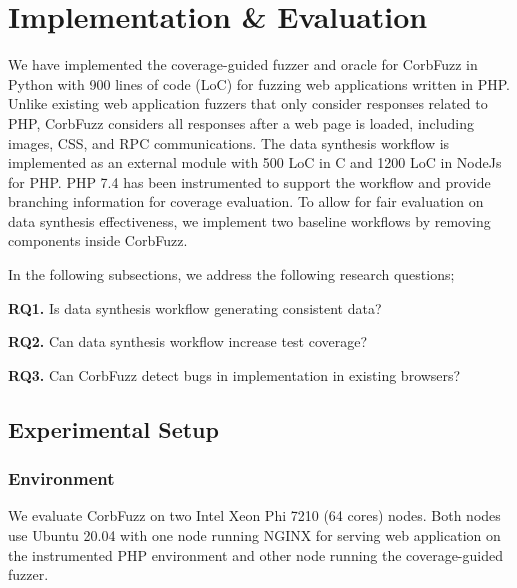 \documentclass[10pt,conference]{IEEEtran}
\begin{document}
\section{Implementation \& Evaluation}
\label{sec:evaluation}
We have implemented the coverage-guided fuzzer and oracle for CorbFuzz in Python with 900 lines of code (LoC) for fuzzing web applications written in PHP. Unlike existing web application fuzzers that only consider responses related to PHP, CorbFuzz considers all responses after a web page is loaded, including images, CSS, and RPC communications. The data synthesis workflow is implemented as an external module with 500 LoC in C and 1200 LoC in NodeJs for PHP. PHP 7.4 has been instrumented to support the workflow and provide branching information for coverage evaluation. To allow for fair evaluation on data synthesis effectiveness, we implement two baseline workflows by removing components inside CorbFuzz. %

In the following subsections, we address the following research questions;

\noindent
\textbf{RQ1.} Is data synthesis workflow generating consistent data?

\noindent
\textbf{RQ2.} Can data synthesis workflow increase test coverage?

\noindent
\textbf{RQ3.} Can CorbFuzz detect bugs in implementation in existing browsers?

\subsection{Experimental Setup}
\subsubsection{Environment} We evaluate CorbFuzz on two Intel Xeon Phi 7210 (64 cores) nodes. Both nodes use Ubuntu 20.04 with one node running NGINX\cite{noauthor_nginx_nodate} for serving web application on the instrumented PHP environment and other node running the coverage-guided fuzzer. 
\end{document}
